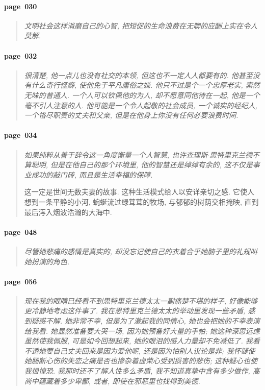 \paragraph*{page~030}
\begin{quotation}
    \itshape
    文明社会这样消磨自己的心智, 把短促的生命浪费在无聊的应酬上实在令人莫解.
\end{quotation}

\paragraph*{page~032}
\begin{quotation}
    \itshape
    很清楚, 他一点儿也没有社交的本领, 但这也不一定人人都要有的. 他甚至没有什么奇行怪癖, 使他免于平凡庸俗之嫌. 他只不过是个一个忠厚老实, 索然无味的普通人. 一个人可以钦佩他的为人, 却不愿意同他待在一起, 他是一个毫不引人注意的人. 他可能是一个令人起敬的社会成员, 一个诚实的经纪人, 一个恪尽职责的丈夫和父亲, 但是在他身上你没有任何必要浪费时间.
\end{quotation}

\paragraph*{page~034}
\begin{quotation}
    \itshape
    如果纯粹从善于辞令这一角度衡量一个人智慧, 也许查理斯$\cdot$思特里克兰德不算聪明, 但是在他自己的那个环境里, 他的智慧还是绰绰有余的, 这不仅是事业成功的敲门砖, 而且是生活幸福的保障.

    这一定是世间无数夫妻的故事. 这种生活模式给人以安详亲切之感. 它使人想到一条平静的小河, 蜿蜒流过绿茸茸的牧场, 与郁郁的树荫交相掩映, 直到最后泻入烟波浩瀚的大海中. 
\end{quotation}

\paragraph*{page~048}
\begin{quotation}
    \itshape
    尽管她悲痛的感情是真实的, 却没忘记使自己的衣着合乎她脑子里的礼规叫她扮演的角色. 
\end{quotation}

\paragraph*{page~056}
\begin{quotation}
    \itshape
    现在我的眼睛已经看不到思特里克兰德太太一副痛楚不堪的样子, 好像能够更冷静地考虑这件事了. 我在思特里克兰德太太的举动里发现一些矛盾, 感到疑惑不解. 她非常不幸, 但是为了激起我的同情心, 她也会把她的不幸表演给我看. 她显然准备要大哭一场, 因为她预备好大量的手帕; 她这种深思远虑虽然使我佩服, 可是如今回想起来, 她的眼泪的感人力量却不免减低了. 我看不透她要自己丈夫回来是因为爱他呢, 还是因为怕别人议论是非; 我怀疑使她肠断心伤的失恋之痛是否也掺杂着虚荣心受到损害的悲伤; 这种疑心也使我很惶恐. 我那时还不了解人性多么矛盾, 我不知道真挚中含有多少做作, 高尚中蕴藏着多少卑鄙, 或者, 即使在邪恶里也找得到美德. 
\end{quotation}


